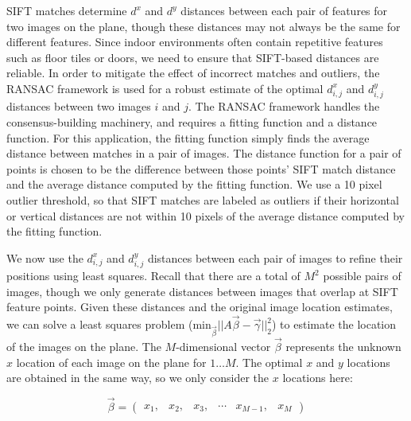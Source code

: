 \documentclass[10pt,twocolumn,letterpaper]{article}
\begin{document}
SIFT matches determine $d^x$ and $d^y$ distances between each pair of
features for two images on the plane, though these distances may not
always be the same for different features. Since indoor environments
often contain repetitive features such as floor tiles or doors, we
need to ensure that SIFT-based distances are reliable. In order to
mitigate the effect of incorrect matches and outliers, the RANSAC
framework \cite{fischler1981random} is used for a robust estimate of
the optimal $d^x_{i,j}$ and $d^y_{i,j}$ distances between two images
$i$ and $j$. The RANSAC framework handles the consensus-building
machinery, and requires a fitting function and a distance
function. For this application, the fitting function simply finds the
average distance between matches in a pair of images. The distance
function for a pair of points is chosen to be the difference between
those points' SIFT match distance and the average distance computed by
the fitting function. We use a 10 pixel outlier threshold, so that
SIFT matches are labeled as outliers if their horizontal or vertical
distances are not within 10 pixels of the average distance computed by
the fitting function.

We now use the $d^x_{i,j}$ and $d^y_{i,j}$ distances between each pair
of images to refine their positions using least squares. Recall that
there are a total of $M^{2}$ possible pairs of images, though we only
generate distances between images that overlap at SIFT feature
points. Given these distances and the original image location
estimates, we can solve a least squares problem
($\textrm{min}_{\vec{\beta}} ||A \vec{\beta} - \vec{\gamma}||_2^2 $)
to estimate the location of the images on the plane. The
$M$-dimensional vector $\vec{\beta}$ represents the unknown $x$
location of each image on the plane for $1 \dots M$. The optimal $x$
and $y$ locations are obtained in the same way, so we only consider
the $x$ locations here:

\[\vec{\beta} =
\begin{pmatrix}
  x_1, & x_2, & x_3, & \cdots & x_{M-1}, & x_M
\end{pmatrix}
\]
\end{document}
